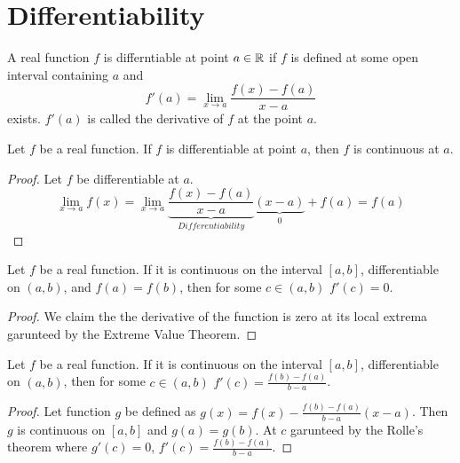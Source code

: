 \documentclass[../note.tex]{subfiles}
\begin{document}
\section{Differentiability}
\begin{definition}[Differentiability]
	A real function $f$ is differntiable at point $a \in \mathbb{R}$ if $f$ is defined at some open interval containing $a$ and 
	\begin{equation}
		f'(a) = \lim_{x \to a} \frac{f(x)-f(a)}{x-a}
	\end{equation}
	exists. $f'(a)$ is called the derivative of $f$ at the point $a$.
\end{definition}

\begin{theorem}
	Let $f$ be a real function. If $f$ is differentiable at point $a$, then $f$ is continuous at $a$.
\end{theorem}

\begin{proof}
	Let $f$ be differentiable at $a$. 
	\[
		\lim_{x \to a}f(x)=
		\lim_{x \to a} \underbrace{\frac{f(x)-f(a)}{x-a}}_{Differentiability}
		\underbrace{(x-a)}_{0}
		+f(a) 
		= f(a)
	\]
\end{proof}

\begin{theorem}
	Let $f$ be a real function. If it is continuous on the interval $[a,b]$, differentiable on $(a,b)$, and $f(a)=f(b)$, then for some $c \in (a,b)$ $f'(c)=0$.
\end{theorem}
\begin{proof}
	We claim the the derivative of the function is zero at its local extrema garunteed by the Extreme Value Theorem.
\end{proof}

\begin{theorem}
	Let $f$ be a real function. If it is continuous on the interval $[a,b]$, differentiable on $(a,b)$, then for some $c \in (a,b)$ $f'(c)=\frac{f(b)-f(a)}{b-a}$.
\end{theorem}
\begin{proof}
	Let function $g$ be defined as $g(x)=f(x)-\frac{f(b)-f(a)}{b-a}(x-a)$. Then $g$ is continuous on $[a,b]$ and $g(a)=g(b)$. At $c$ garunteed by the Rolle's theorem where $g'(c)=0$, $f'(c) = \frac{f(b)-f(a)}{b-a}$.
\end{proof}
\end{document}
